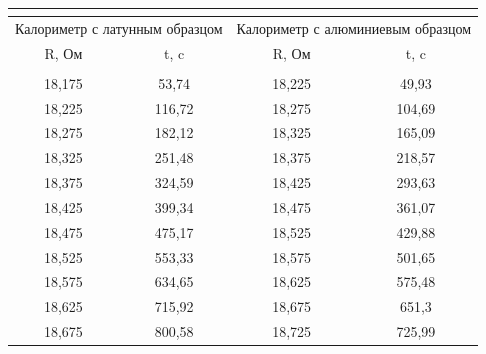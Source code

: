\documentclass[12pt,a4paper]{article}
\begin{document}
\begin{table}[h!]
\begin{center}
\begin{tabular}{|p{3cm}|p{3cm}||p{3cm}p{3cm}|}
\multicolumn{4}{l}{}\\

\hline

\hline \hline
\multicolumn{2}{||c|}{Калориметр с латунным образцом}                                                          & \multicolumn{2}{|c||}{Калориметр с алюминиевым образцом} \\ \hline

\multicolumn{1}{||c|}{R, Ом}  & \multicolumn{1}{|c|}{t, c}    & \multicolumn{1}{|c|}{R, Ом}  & \multicolumn{1}{|c||}{t, c}       \\ \hline \hline

\hline

\multicolumn{4}{l}{}\\

\hline

\multicolumn{1}{|c|}{18,175} & \multicolumn{1}{|c|}{53,74}   & \multicolumn{1}{|c|}{18,225} & \multicolumn{1}{|c|}{49,93}   \\ \hline
\multicolumn{1}{|c|}{18,225} & \multicolumn{1}{|c|}{116,72}  & \multicolumn{1}{|c|}{18,275} & \multicolumn{1}{|c|}{104,69}  \\ \hline
\multicolumn{1}{|c|}{18,275} & \multicolumn{1}{|c|}{182,12}  & \multicolumn{1}{|c|}{18,325} & \multicolumn{1}{|c|}{165,09}  \\ \hline
\multicolumn{1}{|c|}{18,325} & \multicolumn{1}{|c|}{251,48}  & \multicolumn{1}{|c|}{18,375} & \multicolumn{1}{|c|}{218,57}  \\ \hline
\multicolumn{1}{|c|}{18,375} & \multicolumn{1}{|c|}{324,59}  & \multicolumn{1}{|c|}{18,425} & \multicolumn{1}{|c|}{293,63}  \\ \hline
\multicolumn{1}{|c|}{18,425} &\multicolumn{1}{|c|}{399,34}  & \multicolumn{1}{|c|}{18,475} & \multicolumn{1}{|c|}{361,07}  \\ \hline
\multicolumn{1}{|c|}{18,475} & \multicolumn{1}{|c|}{475,17}  & \multicolumn{1}{|c|}{18,525} & \multicolumn{1}{|c|}{429,88}  \\ \hline
\multicolumn{1}{|c|}{18,525} & \multicolumn{1}{|c|}{553,33}  & \multicolumn{1}{|c|}{18,575} & \multicolumn{1}{|c|}{501,65}  \\ \hline
\multicolumn{1}{|c|}{18,575} & \multicolumn{1}{|c|}{634,65}  & \multicolumn{1}{|c|}{18,625} & \multicolumn{1}{|c|}{575,48}  \\ \hline
\multicolumn{1}{|c|}{18,625} & \multicolumn{1}{|c|}{715,92}  & \multicolumn{1}{|c|}{18,675} & \multicolumn{1}{|c|}{651,3}  \\ \hline
\multicolumn{1}{|c|}{18,675} & \multicolumn{1}{|c|}{800,58}  & \multicolumn{1}{|c|}{18,725} & \multicolumn{1}{|c|}{725,99}  \\ \hline

\end{tabular}
\end{center}
\end{table}
\end{document}

